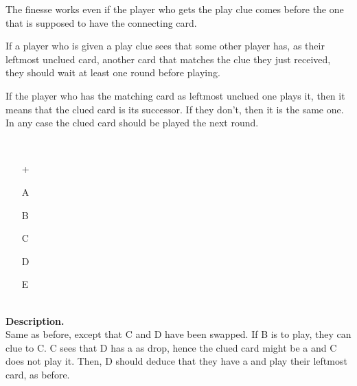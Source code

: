 The finesse works even if the player who gets the play clue comes before the one that is supposed to have the connecting card. 

\begin{convention}
	If a player who is given a play clue sees that some other player has, as their leftmost unclued card, another card that matches the clue they just received, they should wait at least one round before playing.
\end{convention}

If the player who has the matching card as leftmost unclued one plays it, then it means that the clued card is its successor. If they don't, then it is the same one. In any case the clued card should be played the next round.

\begin{example} \hfill \\
	\begin{minipage}{0.45\textwidth}
		\begin{itemize}
			\item[\Large +]      
			\item[\Large A]    
			\item[\Large B]    
			\item[\Large C]    
			\item[\Large D]    
			\item[\Large E]    
		\end{itemize}
	\end{minipage}%
	\begin{minipage}{0.55\textwidth}
		\hfill \\
		
		\textbf{Description.} \\
		
		Same as before, except that C and D have been swapped. If B is to play, they can clue  to C. C sees that D has a  as drop, hence the clued card might be a  and C does not play it. Then, D should deduce that they have a  and play their leftmost card, as before.
	\end{minipage}
\end{example} \vspace{0.15 cm}

